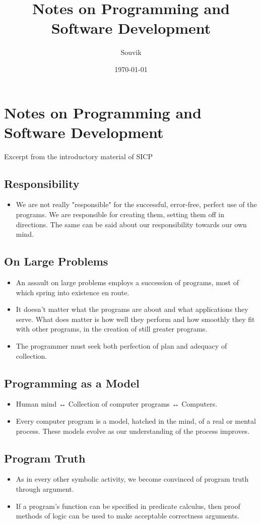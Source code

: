 \documentclass[11pt]{article}
\author{Souvik}
\date{\today}
\title{Notes on Programming and Software Development}
\begin{document}
\maketitle
\section*{Notes on Programming and Software Development}
\label{sec:org9d9ee73}
Excerpt from the introductory material of SICP
\subsection*{Responsibility}
\label{sec:org6f5ce1c}
\begin{itemize}
\item We are not really "responsible" for the successful, error-free, perfect use of the programs. We are responsible for creating them, setting them off in directions. The same can be said about our responsibility towards our own mind.
\end{itemize}
\subsection*{On Large Problems}
\label{sec:org2ed4444}
\begin{itemize}
\item An assault on large problems employs a succession of programs, most of which spring into existence en route.
\item It doesn’t matter what the programs are about and what applications they serve. What does matter is how well they perform and how smoothly they fit with other programs, in the creation of still greater programs.
\item The programmer must seek both perfection of plan and adequacy of collection.
\end{itemize}
\subsection*{Programming as a Model}
\label{sec:org9ac0179}
\begin{itemize}
\item Human mind ↔ Collection of computer programs ↔ Computers.
\item Every computer program is a model, hatched in the mind, of a real or mental process. These models evolve as our understanding of the process improves.
\end{itemize}
\subsection*{Program Truth}
\label{sec:orgd648130}
\begin{itemize}
\item As in every other symbolic activity, we become convinced of program truth through argument.
\item If a program’s function can be specified in predicate calculus, then proof methods of logic can be used to make acceptable correctness arguments.
\end{itemize}
\end{document}
